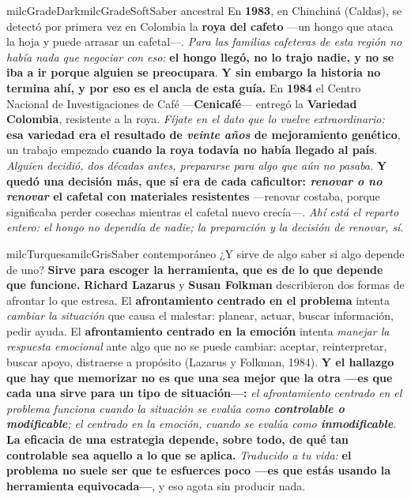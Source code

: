 \documentclass[11pt,letterpaper]{article}
\begin{document}
\begin{softbox}{milcGradeDark}{milcGradeSoft}{Saber ancestral}
En \textbf{1983}, en Chinchiná (Caldas), se detectó por primera vez en Colombia la \textbf{roya del cafeto} ---un hongo que ataca la hoja y puede arrasar un cafetal---. \emph{Para las familias cafeteras de esta región no había nada que negociar con eso:} \textbf{el hongo llegó, no lo trajo nadie, y no se iba a ir porque alguien se preocupara}. \textbf{Y sin embargo la historia no termina ahí, y por eso es el ancla de esta guía.} En \textbf{1984} el Centro Nacional de Investigaciones de Café ---\textbf{Cenicafé}--- entregó la \textbf{Variedad Colombia}, resistente a la roya. \emph{Fíjate en el dato que lo vuelve extraordinario:} \textbf{esa variedad era el resultado de \emph{veinte años} de mejoramiento genético}, un trabajo empezado \textbf{cuando la roya todavía no había llegado al país}. \emph{Alguien decidió, dos décadas antes, prepararse para algo que aún no pasaba.} \textbf{Y quedó una decisión más, que sí era de cada caficultor: \emph{renovar o no renovar} el cafetal con materiales resistentes} ---renovar costaba, porque significaba perder cosechas mientras el cafetal nuevo crecía---. \emph{Ahí está el reparto entero: el hongo no dependía de nadie; la preparación y la decisión de renovar, sí.}
\end{softbox}

\begin{softbox}{milcTurquesa}{milcGris}{Saber contemporáneo}
¿Y sirve de algo saber si algo depende de uno? \textbf{Sirve para escoger la herramienta, que es de lo que depende que funcione.} \textbf{Richard Lazarus} y \textbf{Susan Folkman} describieron dos formas de afrontar lo que estresa. El \textbf{afrontamiento centrado en el problema} intenta \emph{cambiar la situación} que causa el malestar: planear, actuar, buscar información, pedir ayuda. El \textbf{afrontamiento centrado en la emoción} intenta \emph{manejar la respuesta emocional} ante algo que no se puede cambiar: aceptar, reinterpretar, buscar apoyo, distraerse a propósito (Lazarus y Folkman, 1984). \textbf{Y el hallazgo que hay que memorizar no es que una sea mejor que la otra ---es que cada una sirve para un tipo de situación---:} \emph{el afrontamiento centrado en el problema funciona cuando la situación se evalúa como \textbf{controlable o modificable}; el centrado en la emoción, cuando se evalúa como \textbf{inmodificable}}. \textbf{La eficacia de una estrategia depende, sobre todo, de qué tan controlable sea aquello a lo que se aplica.} \emph{Traducido a tu vida:} \textbf{el problema no suele ser que te esfuerces poco ---es que estás usando la herramienta equivocada---}, y eso agota sin producir nada.
\end{softbox}
\end{document}
